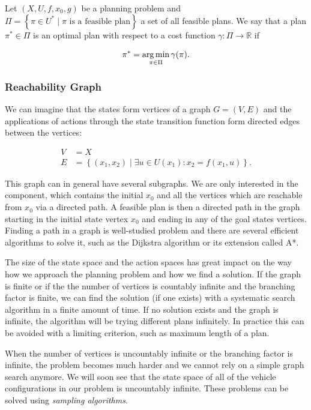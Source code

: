 \begin{defn}
	Let $\left(X, U, f, x_0, g\right)$ be a planning problem and $\Pi=\left\{\pi\in U^* \mid \pi \text{ is a feasible plan}\right\}$ a set of all feasible plans. We say that a plan $\pi^*\in \Pi$ is an optimal plan with respect to a cost function $\gamma: \Pi \rightarrow \mathbb{R}$ if
	
	\[
		\pi^*=\operatorname*{arg\,min}_{\pi\in\Pi} \gamma(\pi).
	\]
\end{defn}

\subsubsection{Reachability Graph}

We can imagine that the states form vertices of a graph $G=(V, E)$ and the applications of actions through the state transition function form directed edges between the vertices:

\begin{equation*}
\begin{aligned}
	V&=X \\
	E&=\left\{(x_1, x_2) \mid \exists u \in U(x_1): x_2 = f(x_1, u) \right\}.
\end{aligned}
\end{equation*}

This graph can in general have several subgraphs. We are only interested in the component, which contains the initial $x_0$ and all the vertices which are reachable from $x_0$ via a directed path. A feasible plan is then a directed path in the graph starting in the initial state vertex $x_0$ and ending in any of the goal states vertices. Finding a path in a graph is well-studied problem and there are several efficient algorithms to solve it, such as the Dijkstra algorithm or its extension called A*.

The size of the state space and the action spaces has great impact on the way how we approach the planning problem and how we find a solution. If the graph is finite or if the the number of vertices is countably infinite and the branching factor is finite, we can find the solution (if one exists) with a systematic search algorithm in a finite amount of time. If no solution exists and the graph is infinite, the algorithm will be trying different plans infinitely. In practice this can be avoided with a limiting criterion, such as maximum length of a plan.

When the number of vertices is uncountably infinite or the branching factor is infinite, the problem becomes much harder and we cannot rely on a simple graph search anymore. We will soon see that the state space of all of the vehicle configurations in our problem is uncountably infinite. These problems can be solved using \textit{sampling algorithms}.

